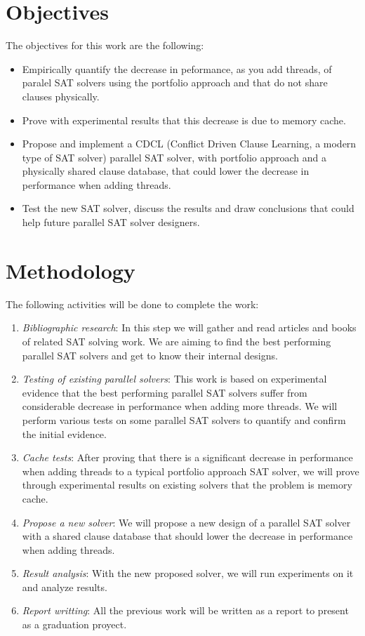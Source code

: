 \documentclass[12pt]{diicc}
\begin{document}
\chapter{Objectives}\label{chap:objectives}
The objectives for this work are the following:
\begin{itemize}
\item Empirically quantify the decrease in peformance, as you add threads, of paralel SAT solvers using the portfolio approach and that do not share clauses physically.
\item Prove with experimental results that this decrease is due to memory cache.
\item Propose and implement a CDCL (Conflict Driven Clause Learning, a modern type of SAT solver) parallel SAT solver, with portfolio approach and a physically shared clause database, that could lower the decrease in performance when adding threads.
\item Test the new SAT solver, discuss the results and draw conclusions that could help future parallel SAT solver designers.
\end{itemize}

\chapter{Methodology}\label{chap:methodology}
The following activities will be done to complete the work:
\begin{enumerate}
\item \textit{Bibliographic research}: In this step we will gather and read articles and books of related SAT solving work. We are aiming to find the best performing parallel SAT solvers and get to know their internal designs.
\item \textit{Testing of existing parallel solvers}: This work is based on experimental evidence that the best performing parallel SAT solvers suffer from considerable decrease in performance when adding more threads. We will perform various tests on some parallel SAT solvers to quantify and confirm the initial evidence.
\item \textit{Cache tests}: After proving that there is a significant decrease in performance when adding threads to a typical portfolio approach SAT solver, we will prove through experimental results on existing solvers that the problem is memory cache.
\item \textit{Propose a new solver}: We will propose a new design of a parallel SAT solver with a shared clause database that should lower the decrease in performance when adding threads.
\item \textit{Result analysis}: With the new proposed solver, we will run experiments on it and analyze results.
\item \textit{Report writting}: All the previous work will be written as a report to present as a graduation proyect.
\end{enumerate}
\end{document}
